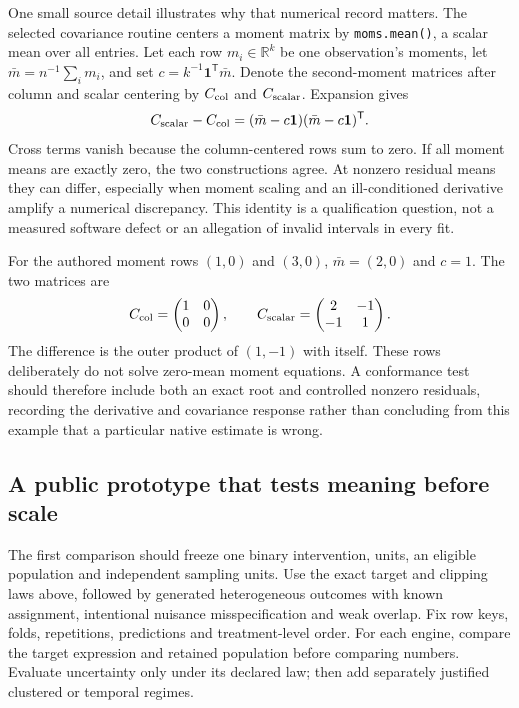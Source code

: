 One small source detail illustrates why that numerical record matters.
The selected covariance routine centers a moment matrix by
\texttt{moms.mean()}, a scalar mean over all entries. Let each row
$m_i\in\mathbb R^k$ be one observation's moments, let
$\bar m=n^{-1}\sum_i m_i$, and set $c=k^{-1}\mathbf1^{\mathsf T}\bar m$.
Denote the second-moment matrices after column and scalar centering by
$C_{\rm col}$ and $C_{\rm scalar}$. Expansion gives
\begin{equation}
 C_{\rm scalar}-C_{\rm col}
   =(\bar m-c\mathbf1)(\bar m-c\mathbf1)^{\mathsf T}.
 \label{exec20:pyfx-centering}
\end{equation}
Cross terms vanish because the column-centered rows sum to zero.
If all moment means are exactly zero, the two constructions agree.
At nonzero residual means they can differ, especially when moment scaling
and an ill-conditioned derivative amplify a numerical discrepancy.
This identity is a qualification question, not a measured software defect
or an allegation of invalid intervals in every fit.
\citep{exec20_python_effect_source}

For the authored moment rows $(1,0)$ and $(3,0)$,
$\bar m=(2,0)$ and $c=1$. The two matrices are
\begin{equation}
 C_{\rm col}=\begin{pmatrix}1&0\\0&0\end{pmatrix},\qquad
 C_{\rm scalar}=\begin{pmatrix}2&-1\\-1&1\end{pmatrix}.
 \label{exec20:pyfx-centering-example}
\end{equation}
The difference is the outer product of $(1,-1)$ with itself. These rows
deliberately do not solve zero-mean moment equations. A conformance test
should therefore include both an exact root and controlled nonzero
residuals, recording the derivative and covariance response rather than
concluding from this example that a particular native estimate is wrong.
\citep{exec20_python_effect_reference}

\subsection{A public prototype that tests meaning before scale}
\label{exec20:pyfx-design}
The first comparison should freeze one binary intervention, units, an
eligible population and independent sampling units. Use the exact target
and clipping laws above, followed by generated heterogeneous outcomes with
known assignment, intentional nuisance misspecification and weak overlap.
Fix row keys, folds, repetitions, predictions and treatment-level order.
For each engine, compare the target expression and retained population
before comparing numbers. Evaluate uncertainty only under its declared law;
then add separately justified clustered or temporal regimes.

